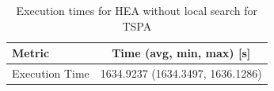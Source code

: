 \begin{table}[h!]
\centering
\begin{tabular}{lc}
\hline
Metric & Time (avg, min, max) [s] \\
\hline
Execution Time & 1634.9237 (1634.3497, 1636.1286) \\
\hline
\end{tabular}
\caption{Execution times for HEA without local search for TSPA}
\label{tab:TSPA_hea_without_ls_timings}
\end{table}

